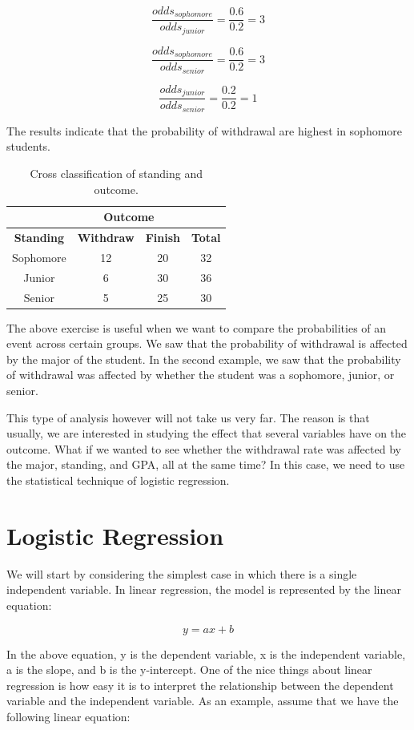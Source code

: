 \documentclass[a4paper,12pt,oneside]{book}
\begin{document}
$$ \frac{odds_{sophomore}}{odds_{junior}}=\frac{0.6}{0.2}=3 $$

$$ \frac{odds_{sophomore}}{odds_{senior}}=\frac{0.6}{0.2}=3 $$

$$ \frac{odds_{junior}}{odds_{senior}}=\frac{0.2}{0.2}=1 $$

The results indicate that the probability of withdrawal are highest in sophomore students.
\begin{table}[h!t]
	\caption{Cross classification of standing and outcome.} \label{table:countcatmore}
	\centering
	\begin{tabular}{c |c c| c}
	\hline
	{} & \multicolumn{2}{|c|}{Outcome} & {} \\
	\hline
	\bf Standing & \bf Withdraw & \bf Finish & \bf Total \\
	Sophomore & 12 & 20 & 32 \\
	Junior & 6 & 30 & 36 \\
	Senior & 5 & 25 & 30 \\
	\hline
	\end{tabular}
\end{table}
The above exercise is useful when we want to compare the probabilities of an event across certain groups. We saw that the probability of withdrawal is affected by the major of the student. 
In the second example, we saw that the probability of withdrawal was affected by whether the student was a sophomore, junior, or senior.

This type of analysis however will not take us very far. The reason is that usually, we are interested in studying the effect that several variables have on the outcome. What if we wanted to see 
whether the withdrawal rate was affected by the major, standing, and GPA, all at the same time? In this case, we need to use the statistical technique of logistic regression. 
\section{Logistic Regression}
We will start by considering the simplest case in which there is a single independent variable. In linear regression, the model is represented by the linear equation:

$$ y=ax+b $$

In the above equation, y is the dependent variable, x is the independent variable, a is the slope, and b is the y-intercept. One of the nice things about linear regression is how easy it is to interpret 
the relationship between the dependent variable and the independent variable. As an example, assume that we have the following linear equation:
\end{document}
